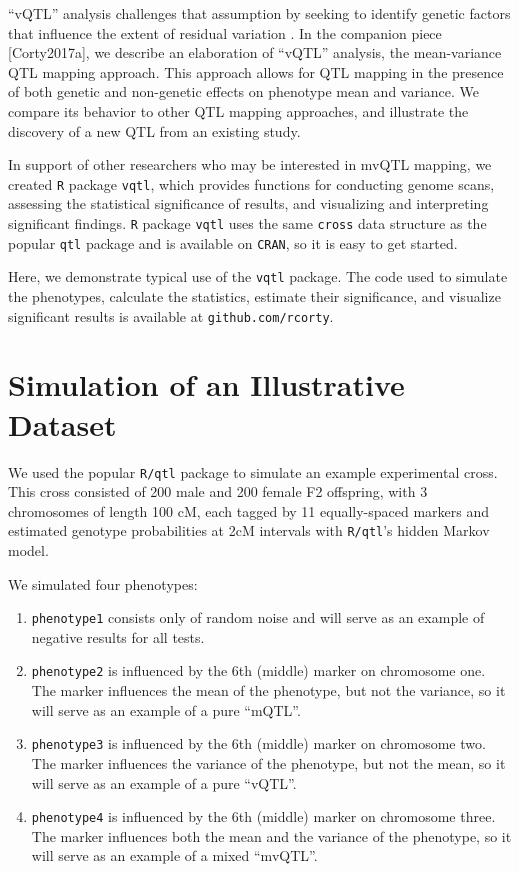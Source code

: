 \documentclass{article}
\begin{document}


``vQTL'' analysis challenges that assumption by seeking to identify genetic factors that influence the extent of residual variation \citep{Ronnegard2011a,Ronnegard2012}.
In the companion piece [Corty2017a], we describe an elaboration of ``vQTL'' analysis, the mean-variance QTL mapping approach.
This approach allows for QTL mapping in the presence of both genetic and non-genetic effects on phenotype mean and variance.
We compare its behavior to other QTL mapping approaches, and illustrate the discovery of a new QTL from an existing study.

In support of other researchers who may be interested in mvQTL mapping, we created \texttt{R} package \texttt{vqtl}, which provides functions for conducting genome scans, assessing the statistical significance of results, and visualizing and interpreting significant findings.
\texttt{R} package \texttt{vqtl} uses the same \texttt{cross} data structure as the popular \texttt{qtl} package and is available on \texttt{CRAN}, so it is easy to get started.

Here, we demonstrate typical use of the \texttt{vqtl} package.
The code used to simulate the phenotypes, calculate the statistics, estimate their significance, and visualize significant results is available at \texttt{github.com/rcorty}.




\section*{Simulation of an Illustrative Dataset}

We used the popular \texttt{R/qtl} package to simulate an example experimental cross.
This cross consisted of 200 male and 200 female F2 offspring, with 3 chromosomes of length 100 cM, each tagged by 11 equally-spaced markers and estimated genotype probabilities at 2cM intervals with \texttt{R/qtl}'s hidden Markov model.

We simulated four phenotypes:

\begin{enumerate}
	\item \texttt{phenotype1} consists only of random noise and will serve as an example of negative results for all tests.
	\item \texttt{phenotype2} is influenced by the 6th (middle) marker on chromosome one.  The marker influences the mean of the phenotype, but not the variance, so it will serve as an example of a pure ``mQTL''.
	\item \texttt{phenotype3} is influenced by the 6th (middle) marker on chromosome two.  The marker influences the variance of the phenotype, but not the mean, so it will serve as an example of a pure ``vQTL''.
	\item \texttt{phenotype4} is influenced by the 6th (middle) marker on chromosome three.  The marker influences both the mean and the variance of the phenotype, so it will serve as an example of a mixed ``mvQTL''.
\end{enumerate}
\end{document}
